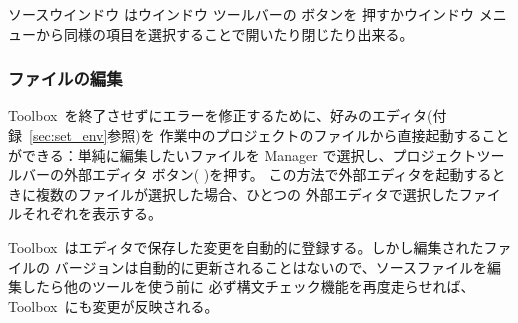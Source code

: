 \documentclass[\pformat,12pt]{jarticle}
\newcommand{\Toolbox}{Toolbox}
\newcommand{\guicmd}[1]{{\gt #1}}
\begin{document}
\guicmd{ソースウインドウ} は\guicmd{ウインドウ} ツールバーの
ボタンを
押すか\guicmd{ウインドウ} メニューから同様の項目を選択することで開いたり閉じたり出来る。

\subsubsection{ファイルの編集}


\Toolbox\ を終了させずにエラーを修正するために、好みのエディタ(付録~\ref{sec:set_env}参照)を
作業中のプロジェクトのファイルから直接起動することができる：単純に編集したいファイルを
\guicmd{Manager} で選択し、\guicmd{プロジェクト}ツールバーの\guicmd{外部エディタ}
 ボタン(%
)を押す。
この方法で\guicmd{外部エディタ}を起動するときに複数のファイルが選択した場合、ひとつの
\guicmd{外部エディタ}で選択したファイルそれぞれを表示する。

\Toolbox\ はエディタで保存した変更を自動的に登録する。しかし編集されたファイルの
バージョンは自動的に更新されることはないので、ソースファイルを編集したら他のツールを使う前に
必ず構文チェック機能を再度走らせれば、\Toolbox\ にも変更が反映される。


\end{document}
